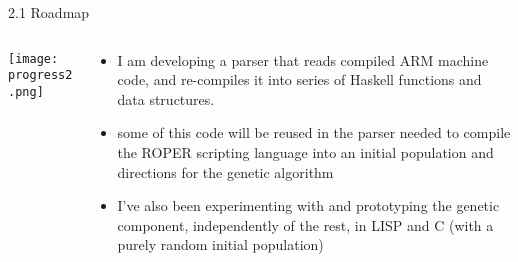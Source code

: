 \documentclass[9pt]{beamer}
\begin{document}
\begin{frame}{2.1 Roadmap}
\begin{columns}

\begin{column}{.3\textwidth}
\begin{center}
\texttt{[image: progress2.png]}
\end{center}
\end{column}

\begin{column}{.7\textwidth}
\begin{itemize}

\item I am developing a parser that reads compiled ARM machine code, and re-compiles it into series of Haskell functions and data structures.

\item some of this code will be reused in the parser needed to compile the ROPER scripting language into an initial population and directions for the genetic algorithm

\item I've also been experimenting with and prototyping the genetic component, independently of the rest, in LISP and C (with a purely random initial population)

\end{itemize}
\end{column}

\end{columns}
\end{frame}
\end{document}
